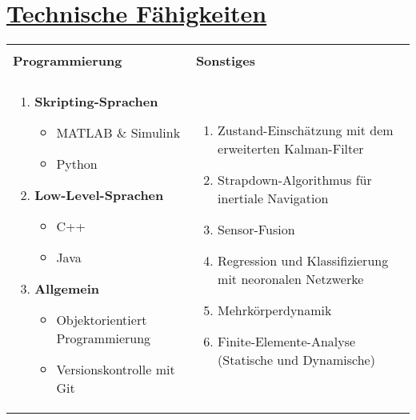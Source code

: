 \section{\underline{Technische Fähigkeiten}}
\vspace{-1.5 em}
\begin{table}[H]
	\centering
	\begin{tabularx}{\textwidth}{|>{\setlength\hsize{1\hsize}\setlength\linewidth{1\hsize}}X|>{\setlength\hsize{1\hsize}\setlength\linewidth{1\hsize}}X|}
		\hline
		&\\[-2 ex]
		\large{\textbf{Programmierung}} & \large{\textbf{Sonstiges}}\\[0.05 in]
		\hline
		&\\[-5 ex]
		\begin{enumerate}
		\item\large{\textbf{Skripting-Sprachen}}
		\begin{itemize}
			\item\large{MATLAB $\&$ Simulink}
			\item\large{Python}
		\end{itemize}
		\item\large{\textbf{Low-Level-Sprachen}}
		\begin{itemize}
			\item\large{C++}
			\item\large{Java}
		\end{itemize}
		\item\large{\textbf{Allgemein}}
		\begin{itemize}
			\item Objektorientiert Programmierung
			\item Versionskontrolle mit Git
		\end{itemize}
	\end{enumerate} & \begin{enumerate}
			\item\large{Zustand-Einschätzung mit dem erweiterten Kalman-Filter}
			\item\large{Strapdown-Algorithmus für inertiale Navigation}
			\item\large{Sensor-Fusion}
			\item\large{Regression und Klassifizierung mit neoronalen Netzwerke}
			\item\large{Mehrkörperdynamik}
			\item\large{Finite-Elemente-Analyse (Statische und Dynamische)}
			\end{enumerate}\\
		\hline
	\end{tabularx}
\end{table}
